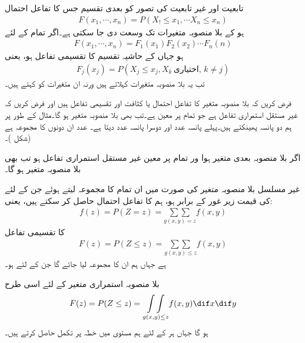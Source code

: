 تابعیت اور غیر تابعیت کی تصور کو  بعدی تقسیم  جس کا تفاعل احتمال
\begin{align*}
F(x_1,\cdots,x_n)=P(X_!\le x_1,\cdots X_n\le x_n)
\end{align*}
ہو کے  بلا منصوبہ متغیرات  تک وسعت دی جا سکتی ہے۔اگر تمام  کے لئے
\begin{align}
F(x_1,\cdots,x_n)=F_1(x_1)F_2(x_2)\cdots F_n(n)
\end{align}
ہو جہاں  کے حاشیہ تقسیم کا تقسیمی تفاعل  ہو، یعنی
\begin{align*}
F_j(x_j)=P(X_j\le x_j, X_k\, \text{اختیاری},\, k\ne j)
\end{align*}
تب یہ بلا منصوبہ متغیرات  کہلاتے ہیں ورنہ  ان متغیرات کو  کہتے ہیں۔

فرض کریں کہ بلا منصوبہ متغیر  کا تفاعل احتمال یا کثافت  اور تقسیمی تفاعل  ہیں اور فرض کریں کہ  غیر مستقل استمراری تفاعل ہے جو تمام  پر معین ہے۔تب  بھی بلا منصوبہ متغیر ہو گا۔مثال کے طور پر ہم دو پانسہ پھینکتے ہیں۔پہلے پانسہ عدد  اور دوسرا پانسہ عدد  دیتا ہے۔ عدد  ان دونوں کا مجموعہ ہے (شکل )۔

اگر  بلا منصوبہ   بعدی متغیر ہوا ور تمام  پر   معین غیر مستقل استمراری تفاعل ہو  تب  بھی بلا منصوبہ متغیر ہو گا۔

غیر مسلسل بلا منصوبہ متغیر  کی صورت میں ان تمام  کا مجموعہ لیتے ہوئے جن کے لئے  کی قیمت زیر غور  کے برابر ہو،  ہم  کا تفاعل احتمال  حاصل کر سکتے ہیں، یعنی:
\begin{align}
f(z)=P(Z=z)=\underset{g(x,y)=z}{\sum\sum} f(x,y)
\end{align}
 کا تقسیمی تفاعل
\begin{align}
F(z)=P(Z\le z)=\underset{g(x,y)\le z}{\sum\sum} f(x,y)
\end{align}
ہے جہاں ہم ان  کا مجموعہ لیا جائے گا جن کے لئے  ہو۔

بلا منصوبہ استمراری متغیر  کے لئے اسی طرح
\begin{align}
F(z)=P(Z\le z) =\underset{g(x,y)\le z}{\int\int} f(x,y)\dif x\dif y
\end{align}
ہو گا جہاں ہر  کے لئے ہم  مستوی میں خطہ  پر تکمل حاصل کرتے ہیں۔

